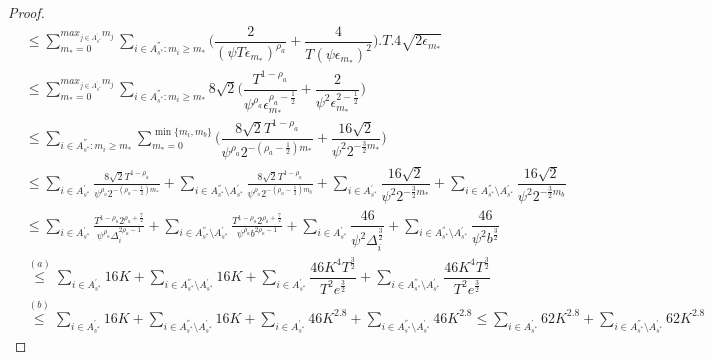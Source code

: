 \begin{proof}
\begin{align*}
&\leq\sum_{m_{*}=0}^{max_{j\in A^{'}_{s^{*}}}m_{j}}\sum_{i\in A^{''}_{s^{*}}:m_{i} \geq m_{*}}\bigg(\dfrac{2}{(\psi  T\epsilon_{m_{*}})^{\rho_{a}}} + \dfrac{4}{T(\psi\epsilon_{m_{*}})^2} \bigg).T.4\sqrt{2\epsilon_{m_{*}}} \\
&\leq\sum_{m_{*}=0}^{max_{j\in A^{'}_{s^{*}}}m_{j}}\sum_{i\in A^{''}_{s^{*}}:m_{i} \geq m_{*}}8\sqrt{2}\bigg(\dfrac{T^{1-\rho_{a}}}{\psi^{\rho_{a}}\epsilon_{m_{*}}^{\rho_{a}-\frac{1}{2}}} + \dfrac{2}{\psi^2 \epsilon_{m_{*}}^{2-\frac{1}{2}}}\bigg)\\
&\leq\sum_{i\in A^{''}_{s^{*}}:m_{i} \geq m_{*}}\sum_{m_{*}=0}^{\min{\lbrace m_{i},m_{b}\rbrace}}\bigg(\dfrac{8\sqrt{2} T^{1-\rho_{a}}}{\psi^{\rho_{a}}2^{-(\rho_{a}-\frac{1}{2})m_{*}}} + \dfrac{16\sqrt{2}}{\psi^2 2^{-\frac{3}{2}m_{*}}}\bigg)\\
&\!\leq\!\!\sum_{i\in A^{'}_{s^{*}}}\frac{8\sqrt{2} T^{1-\rho_{a}}}{\psi^{\rho_{a}}2^{-(\rho_{a}-\frac{1}{2})m_{*}}}\! +\!\!\!\sum_{i\in A^{''}_{s^{*}}\setminus A^{'}_{s^{*}}}\!\frac{8\sqrt{2} T^{1-\rho_{a}}}{\psi^{\rho_{a}}2^{-(\rho_{a}-\frac{1}{2})m_{b}}} + \sum_{i\in A^{'}_{s^{*}}}\dfrac{16\sqrt{2}}{\psi^2 2^{-\frac{3}{2}m_{*}}} + \sum_{i\in A^{''}_{s^{*}}\setminus A^{'}_{s^{*}}}\dfrac{16\sqrt{2}}{\psi^2 2^{-\frac{3}{2}m_{b}}} \\
&\!\leq\!\!\sum_{i\in A^{'}_{s^{*}}}\frac{T^{1-\rho_{a}}2^{\rho_{a}+\frac{7}{2}}}{\psi^{\rho_{a}}\Delta_{i}^{2\rho_{a}-1}} \!+\!\!\!\sum_{i\in A^{''}_{s^{*}}\setminus A^{'}_{s^{*}}}\!\!\frac{T^{1-\rho_{a}}2^{\rho_{a}+\frac{7}{2}}}{\psi^{\rho_{a}}b^{2\rho_{a}-1}} +  \sum_{i\in A^{'}_{s^{*}}}\dfrac{46}{\psi^2 \Delta_i^{\frac{3}{2}}} + \sum_{i\in A^{''}_{s^{*}}\setminus A^{'}_{s^{*}}}\dfrac{46}{\psi^2 b^{\frac{3}{2}}}\\
& \overset{(a)}{\leq} \sum_{i\in A^{'}_{s^{*}}} 16K \!+\!\!\!\sum_{i\in A^{''}_{s^{*}}\setminus A^{'}_{s^{*}}}\!\! 16K + \sum_{i\in A^{'}_{s^{*}}}\dfrac{46 K^4 T^{\frac{3}{2}}}{T^2 e^{\frac{3}{2}}} + \sum_{i\in A^{''}_{s^{*}}\setminus A^{'}_{s^{*}}}\dfrac{46 K^4 T^{\frac{3}{2}}}{T^2 e^{\frac{3}{2}}}\\
& \overset{(b)}{\leq} \sum_{i\in A^{'}_{s^{*}}} 16K \!+\!\!\!\sum_{i\in A^{''}_{s^{*}}\setminus A^{'}_{s^{*}}}\!\! 16K + \sum_{i\in A^{'}_{s^{*}}} 46K^{2.8} \!+\!\!\!\sum_{i\in A^{''}_{s^{*}}\setminus A^{'}_{s^{*}}}\!\! 46K^{2.8} \leq \sum_{i\in A^{'}_{s^{*}}} 62K^{2.8} \!+\!\!\!\sum_{i\in A^{''}_{s^{*}}\setminus A^{'}_{s^{*}}}\!\! 62K^{2.8} 
\end{align*}


\end{proof}
